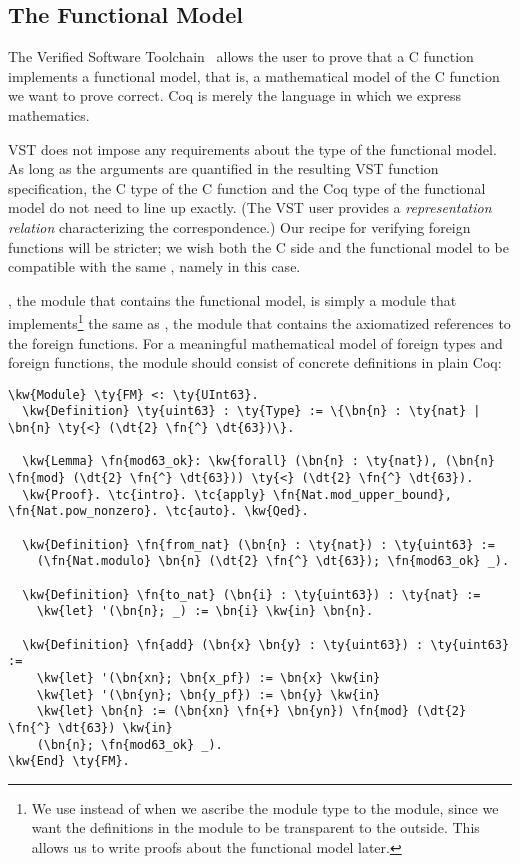 \subsection{The Functional Model}

The Verified Software Toolchain~\cite{appel2023verifiable, appel2023sf} allows the user to prove that a C function implements a \gls{functional model}, that is, a mathematical model of the C function we want to prove correct. Coq is merely the language in which we express mathematics.

VST does not impose any requirements about the type of the \gls{functional model}. As long as the arguments are quantified in the resulting VST function specification, the C type of the C function and the Coq type of the \gls{functional model} do not need to line up exactly. (The VST user provides a \emph{representation relation} characterizing the correspondence.)
Our recipe for verifying \gls{foreign function}s will be stricter; we wish both the C side and the \gls{functional model} to be compatible with the same , namely  in this case.

, the module that contains the functional model, is simply a module that implements\footnote{We use \code{<:} instead of \code{:} when we ascribe the module type to the module, since we want the definitions in the module to be transparent to the outside. This allows us to write proofs about the \gls{functional model} later.} the same  as , the module that contains the axiomatized references to the \gls{foreign function}s. For a meaningful mathematical model of \gls{foreign type}s and \gls{foreign function}s, the  module should consist of concrete definitions in plain Coq:

\begin{Verbatim}
\kw{Module} \ty{FM} <: \ty{UInt63}.
  \kw{Definition} \ty{uint63} : \ty{Type} := \{\bn{n} : \ty{nat} | \bn{n} \ty{<} (\dt{2} \fn{^} \dt{63})\}.

  \kw{Lemma} \fn{mod63_ok}: \kw{forall} (\bn{n} : \ty{nat}), (\bn{n} \fn{mod} (\dt{2} \fn{^} \dt{63})) \ty{<} (\dt{2} \fn{^} \dt{63}).
  \kw{Proof}. \tc{intro}. \tc{apply} \fn{Nat.mod_upper_bound}, \fn{Nat.pow_nonzero}. \tc{auto}. \kw{Qed}.
  
  \kw{Definition} \fn{from_nat} (\bn{n} : \ty{nat}) : \ty{uint63} :=
    (\fn{Nat.modulo} \bn{n} (\dt{2} \fn{^} \dt{63}); \fn{mod63_ok} _).

  \kw{Definition} \fn{to_nat} (\bn{i} : \ty{uint63}) : \ty{nat} :=
    \kw{let} '(\bn{n}; _) := \bn{i} \kw{in} \bn{n}.

  \kw{Definition} \fn{add} (\bn{x} \bn{y} : \ty{uint63}) : \ty{uint63} :=
    \kw{let} '(\bn{xn}; \bn{x_pf}) := \bn{x} \kw{in}
    \kw{let} '(\bn{yn}; \bn{y_pf}) := \bn{y} \kw{in}
    \kw{let} \bn{n} := (\bn{xn} \fn{+} \bn{yn}) \fn{mod} (\dt{2} \fn{^} \dt{63}) \kw{in}
    (\bn{n}; \fn{mod63_ok} _).
\kw{End} \ty{FM}.
\end{Verbatim}


